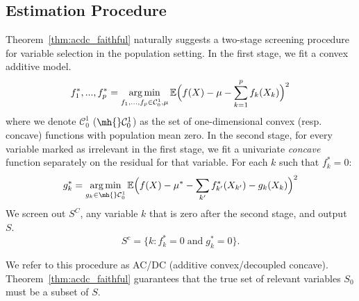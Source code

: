 \def\C{\mathcal{C}}

\subsection{Estimation Procedure}
\label{sec:acdc}

Theorem~\ref{thm:acdc_faithful} naturally suggests 
a two-stage screening procedure for variable selection in the population setting. In the first stage, we fit a convex additive model. 
\begin{equation}
\label{eqn:scam2_pop}
f^*_1, ..., f^*_p = \argmin_{f_1,...,f_p \in \C^1_0, \mu} 
   \E \Big( f(X) - \mu - \sum_{k=1}^p f_k(X_k) \Big)^2 
\end{equation}
where we denote $\C^1_0$ ($\mh{}\C^1_0$) as the set of one-dimensional convex (resp. concave) functions with population mean zero. In the second stage, for every variable marked as irrelevant in the first stage, we fit a univariate \emph{concave} function separately on the residual for that variable.
 For each $k$ such that $ f^*_k = 0$:
\begin{equation}
\label{eqn:dc2}
g^*_k = \argmin_{g_k \in \mh{}\C^1_0} 
   \E \Big( f(X) - \mu^* - \sum_{k'} f^*_{k'}(X_{k'}) 
    - g_k(X_{k})\Big)^2 
\end{equation}
We screen out $S^C$, any variable $k$ that is zero after the second stage, and output $S$.
\begin{equation}
\label{eqn:acdc_vars_pop}
S^c = \bigl\{k : f^*_k =
0 \; \mathrm{and}\; g^*_k =0\bigr\}.
\end{equation}

We refer to this procedure as AC/DC (additive convex/decoupled
concave). Theorem~\ref{thm:acdc_faithful} guarantees that the true set
of relevant variables $S_0$ must be a subset of $S$.


